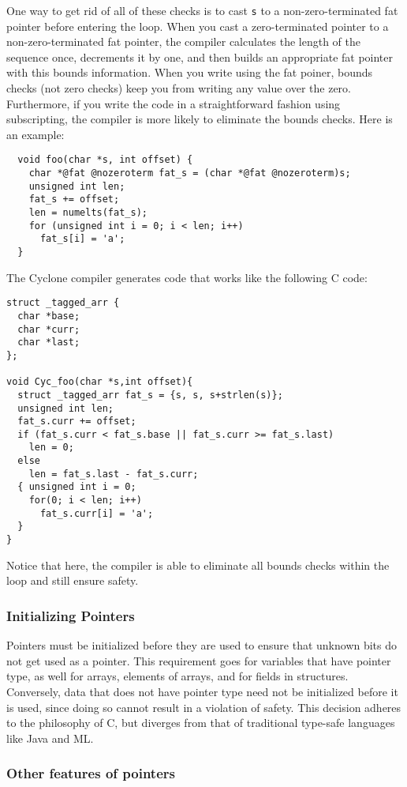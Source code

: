 One way to get rid of all of these checks is to cast \texttt{s} to a
non-zero-terminated fat pointer before entering the loop.  When you
cast a zero-terminated pointer to a non-zero-terminated fat pointer,
the compiler calculates the length of the sequence once, decrements it
by one, and then builds an appropriate fat pointer with this bounds
information.  When you write using the fat poiner, bounds checks (not
zero checks) keep you from writing any value over the zero.
Furthermore, if you write the code in a straightforward fashion using
subscripting, the compiler is more likely to eliminate the bounds
checks.  Here is an example:
\begin{verbatim}
  void foo(char *s, int offset) {
    char *@fat @nozeroterm fat_s = (char *@fat @nozeroterm)s;
    unsigned int len; 
    fat_s += offset;
    len = numelts(fat_s);    
    for (unsigned int i = 0; i < len; i++)
      fat_s[i] = 'a';
  }
\end{verbatim}
The Cyclone compiler generates code that works like the following C code:
\begin{verbatim}
struct _tagged_arr { 
  char *base;
  char *curr;
  char *last;
};

void Cyc_foo(char *s,int offset){
  struct _tagged_arr fat_s = {s, s, s+strlen(s)};
  unsigned int len;
  fat_s.curr += offset;
  if (fat_s.curr < fat_s.base || fat_s.curr >= fat_s.last) 
    len = 0;
  else 
    len = fat_s.last - fat_s.curr;
  { unsigned int i = 0;
    for(0; i < len; i++)
      fat_s.curr[i] = 'a';
  }
}
\end{verbatim}
Notice that here, the compiler is able to eliminate all bounds
checks within the loop and still ensure safety.

\subsubsection*{Initializing Pointers}

Pointers must be initialized before they are used to ensure that unknown
bits do not get used as a pointer.  This requirement goes for
variables that have pointer type, as well for arrays, elements of arrays,
and for fields in structures.  Conversely, data that does not have pointer
type need not be initialized before it is used, since doing so cannot result
in a violation of safety.  This decision adheres to the philosophy of C, but
diverges from that of traditional type-safe languages like Java and ML.

\subsubsection*{Other features of pointers}

